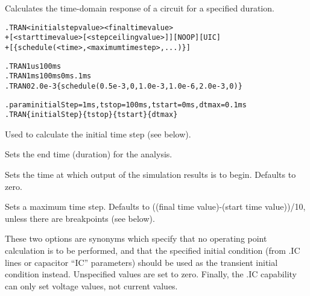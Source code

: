 


 
Calculates the time-domain response of a circuit for a specified duration.

\begin{Command}

\format
\begin{alltt}
.TRAN <initial step value> <final time value>
+ [<start time value> [<step ceiling value>]] [NOOP] [UIC]
+ [\{schedule( <time>, <maximum time step>, ... )\}]
\end{alltt}

\examples
\begin{alltt}
.TRAN 1us 100ms
.TRAN 1ms 100ms 0ms .1ms
.TRAN 0 2.0e-3  \{schedule( 0.5e-3, 0, 1.0e-3, 1.0e-6, 2.0e-3, 0 )\}

.param initialStep=1ms, tstop=100ms, tstart=0ms, dtmax=0.1ms
.TRAN \{initialStep\} \{tstop\} \{tstart\} \{dtmax\}
\end{alltt}

\arguments

\begin{Arguments}


Used to calculate the initial time step (see below).


Sets the end time (duration) for the analysis.


Sets the time at which output of the simulation results is to begin.  Defaults to zero.


Sets a maximum time step.  Defaults to ((final time value)-(start time
value))/10, unless there are breakpoints (see below).


These two options are synonyms which specify that no operating point
calculation is to be performed, and that the specified initial
condition (from .IC lines or capacitor ``IC'' parameters) should be
used as the transient initial condition instead. Unspecified values
are set to zero.  Finally, the .IC capability can only set voltage
values, not current values.


\end{Arguments}
\end{Command}

